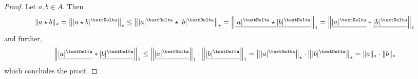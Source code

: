 \begin{proof}
    Let $ a, b \in A $.
    Then
    \begin{align*}
        \norm{ a \star b }_\star
        =
        \Norm{ \absDi{ a \star b } }_\star
        \leq
        \Norm{ \absDi{ a } \star \absDi{ b } }_\star
        =
        \Norm{ \underline{ \absDi{ a } \star \absDi{ b } } }_1
        =
        \Norm{ \underline{ \absDi{ a } } \conv
        \underline{ \absDi{ b } } }_1
    \end{align*}
    and further,
    \begin{align*}
        \Norm{ \underline{ \absDi{ a } } \conv
        \underline{ \absDi{ b } } }_1
        \leq
        \Norm{ \underline{ \absDi{ a } } }_1 \cdot
        \Norm{ \underline{ \absDi{ b } } }_1
        =
        \Norm{ \absDi{ a } }_\star \mult \Norm{ \absDi{ b } }_\star
        =
        \norm{ a }_\star \mult \norm{ b }_\star        
    \end{align*}
    which concludes the proof.
\end{proof}